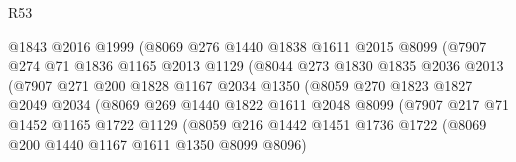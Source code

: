 \begin{lexlean}{R53}
\begin{coremodule}
                                @1843
                                @2016
                                @1999
                                (@8069
                                  @276
                                  @1440
                                  @1838
                                  @1611
                                  @2015
                                  @8099
                                  (@7907
                                    @274
                                    @71
                                    @1836
                                    @1165
                                    @2013
                                    @1129
                                    (@8044
                                      @273
                                      @1830
                                      @1835
                                      @2036
                                      @2013
                                      (@7907
                                        @271
                                        @200
                                        @1828
                                        @1167
                                        @2034
                                        @1350
                                        (@8059
                                          @270
                                          @1823
                                          @1827
                                          @2049
                                          @2034
                                          (@8069
                                            @269
                                            @1440
                                            @1822
                                            @1611
                                            @2048
                                            @8099
                                            (@7907
                                              @217
                                              @71
                                              @1452
                                              @1165
                                              @1722
                                              @1129
                                              (@8059
                                                @216
                                                @1442
                                                @1451
                                                @1736
                                                @1722
                                                (@8069 @200 @1440 @1167 @1611 @1350 @8099 @8096)

\end{coremodule}
\end{lexlean}
